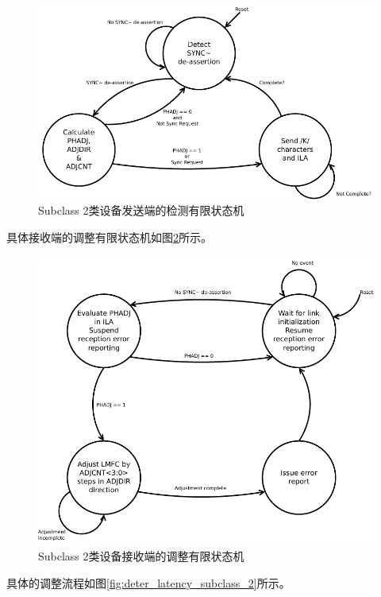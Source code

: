 \documentclass[UTF8]{ctexart}
\begin{document}
\begin{figure}[H]
\centering
\includegraphics[width=12cm]{./img/TX_logic_device_subclass_2_control_machine.pdf}
\caption{Subclass 2类设备发送端的检测有限状态机}
\label{fig:TX_logic_device_subclass_2_control_machine}
\end{figure}

具体接收端的调整有限状态机如图\ref{fig:Subclass_2_DAC_adjustment_machine}所示。

\begin{figure}[H]
\centering
\includegraphics[width=12cm]{./img/Subclass_2_DAC_adjustment_machine.pdf}
\caption{Subclass 2类设备接收端的调整有限状态机}
\label{fig:Subclass_2_DAC_adjustment_machine}
\end{figure}

具体的调整流程如图\ref{fig:deter_latency_subclass_2}所示。
\end{document}

